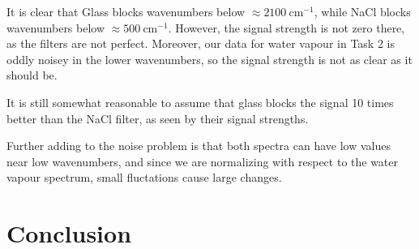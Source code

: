 \documentclass{article}
\begin{document}
It is clear that Glass blocks wavenumbers below $\approx 2100 \ \text{cm}^{-1}$, while NaCl blocks wavenumbers below $\approx 500 \ \text{cm}^{-1}$. However, the signal strength is not zero there, as the filters are not perfect.
Moreover, our data for water vapour in Task 2 is oddly noisey in the lower wavenumbers, so the signal strength is not as clear as it should be.  

It is still somewhat reasonable to assume that glass blocks the signal 10 times better than the NaCl filter, as seen by their signal strengths.

Further adding to the noise problem is that both spectra can have low values near low wavenumbers, and since we are normalizing with respect to the water vapour spectrum, small fluctations cause large changes.

\pagebreak{}

\section{Conclusion}

\pagebreak{}
\end{document}
